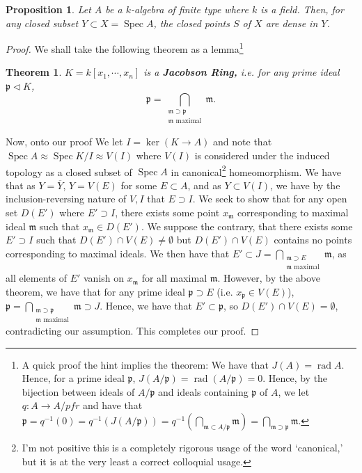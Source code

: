 \documentclass[english]{article}
\DeclareMathOperator{\spec}{Spec}
\DeclareMathOperator{\rad}{rad}
\newcommand{\mfr}{\mathfrak{m}}
\newcommand{\pfr}{\mathfrak{p}}
\newtheorem*{thm*}{Theorem}
\newtheorem*{proposition*}{Proposition}
\theoremstyle{remark}
\theoremstyle{definition}
\newcommand{\cl}{\overline}
\begin{document}
\begin{proposition*}
	Let $A$ be a $k$-algebra of finite type where $k$ is a field. Then, for any closed subset $Y\subset X=\spec A$, the closed points $S$ of $X$ are dense in $Y$.
\end{proposition*}\begin{proof}

We shall take the following theorem as a lemma\footnote{A quick proof the hint implies the theorem: We have that $J(A)=\rad A$. Hence, for a prime ideal $\pfr$, $J(A/\pfr)=\rad(A/\pfr)=0$. Hence, by the bijection between ideals of $A/\pfr$ and ideals containing $\pfr$ of $A$, we let $q:A\to A/pfr$ and have that $\pfr=q^{-1}(0)=q^{-1}(J(A/\pfr))=q^{-1}\left(\bigcap_{\mfr\subset A/\pfr}\mfr\right)=\bigcap_{\mfr \supset \pfr}\mfr$.}
\begin{thm*}\cite[Prop. 11.67, 11.70]{rot}
	$K=k[x_1,\cdots,x_n]$ is a \textbf{Jacobson Ring,} i.e. for any prime ideal $\pfr\triangleleft K$, 
	$$\pfr=\bigcap_{\substack{\mfr\supset \pfr\\\mfr\text{ maximal}}}\mfr.$$
\end{thm*}
Now, onto our proof
We let $I=\ker (K\to A)$ and note that $\spec A\approx\spec K/I\approx V(I)$ where $V(I)$ is considered under the induced topology as a closed subset of $\spec A$ in canonical\footnote{I'm not positive this is a completely rigorous usage of the word `canonical,' but it is at the very least a correct colloquial usage.} homeomorphism.
We have that as $Y=\cl{Y}$, $Y=V(E)$ for some $E\subset A$, and as $Y\subset V(I)$, we have by the inclusion-reversing nature of $V,I$ that $E\supset I$. We seek to show that for any open set $D(E')$ where $E'\supset I$, there exists some point $x_\mfr$ corresponding to maximal ideal $\mfr$ such that $x_\mfr\in D(E')$. We suppose the contrary, that there exists some $E'\supset I$ such that $D(E')\cap V(E)\neq \emptyset$ but $D(E')\cap V(E)$ contains no points corresponding to maximal ideals. We then have that $\displaystyle{E'\subset J=\bigcap_{\substack{\mfr\supset E\\\mfr\text{ maximal}}}}\mfr$, as all elements of $E'$ vanish on $x_{\mfr}$ for all maximal $\mfr$. However, by the above theorem, we have that for any prime ideal $\pfr\supset E$ (i.e. $x_\pfr\in V(E)$), $\pfr=\bigcap_{\substack{\mfr\supset \pfr\\\mfr\text{ maximal}}}\mfr\supset J$. Hence, we have that $E'\subset \pfr$, so $D(E')\cap V(E)=\emptyset$, contradicting our assumption. This completes our proof.
\end{proof}
\printbibliography
\end{document}
